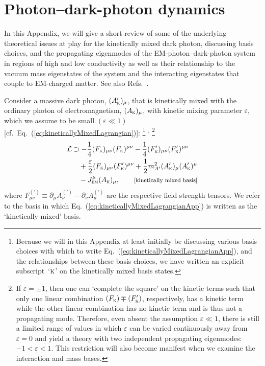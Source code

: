 \documentclass[amsmath,amssymb,aps,10pt,prd,letterpaper,nofootinbib,balancelastpage,notitlepage,superscriptaddress,twocolumn,floatfix]{revtex4-2}
\newcommand{\up}[1]{\textsuperscript{#1}}			%
\renewcommand{\eqref}[2][]{Eq{#1}.~(\ref{eq:#2})}	%
\newcommand{\citeR}[2][]{Ref{#1}.~\cite{#2}}		%
\newcommand{\nl}{\nonumber \\ & \quad }					%
\newcommand{\LL}{\mathcal{L}}
\newcommand{\kin}[1]{({#1}_{\textsc{k}})}
\newcommand{\primekin}[1]{({#1}_{\textsc{k}}^\prime)}
\begin{document}
\section{Photon--dark-photon dynamics}
\label{app:systemBehavior}

In this Appendix, we will give a short review of some of the underlying theoretical issues at play for the kinetically mixed dark photon, discussing basis choices, and the propagating eigenmodes of the EM-photon--dark-photon system in regions of high and low conductivity as well as their relationship to the vacuum mass eigenstates of the system and the interacting eigenstates that couple to EM-charged matter.
See also \citeR[s]{Nelson:2011sf,Graham:2014sha,Chaudhuri:2014dla,Raffelt:1996wa}.

Consider a massive dark photon, $(A_{\textsc{k}}')_\mu$, that is kinetically mixed with the ordinary photon of electromagnetism, $(A_{\textsc{k}})_\mu$, with kinetic mixing parameter $\varepsilon$, which we assume to be small $(\varepsilon \ll 1)$ [cf.~\eqref{kineticallyMixedLagrangian}]:%
\footnote{\label{ftnt:basisLabel}%
    Because we will in this Appendix at least initially be discussing various basis choices with which to write \eqref{kineticallyMixedLagrangianApp}, and the relationships between these basis choices, we have written an explicit subscript~`$\textsc{k}$' on the kinetically mixed basis states.
}%
\up{,}%
\footnote{\label{ftnt:epsilonLimit}%
    If $\varepsilon = \pm 1$, then one can `complete the square' on the kinetic terms such that only one linear combination $\kin{F} \mp \primekin{F}$, respectively, has a kinetic term while the other linear combination has no kinetic term and is thus not a propagating mode.
    Therefore, even absent the assumption $\varepsilon \ll 1$, there is still a limited range of values in which $\varepsilon$ can be varied continuously away from $\varepsilon = 0$ and yield a theory with two independent propagating eigenmodes: $-1<\varepsilon<1$. 
    This restriction will also become manifest when we examine the interaction and mass bases.
} %
\begin{align}
    \LL &\supset - \frac{1}{4} \kin{F}_{\mu\nu}\kin{F}^{\mu\nu} - \frac{1}{4} \primekin{F}_{\mu\nu} \primekin{F}^{\mu\nu} \nl
    + \frac{\varepsilon}{2} \kin{F}_{\mu\nu} \primekin{F}^{\mu\nu} + \frac{1}{2} m_{A'}^2 \primekin{A}_\mu \primekin{A}^{\mu} \nl
    - J_{\textsc{em}}^\mu \kin{A}_\mu, \qquad \text{\footnotesize[kinetically mixed basis]}
    \label{eq:kineticallyMixedLagrangianApp}
\end{align}
where $F^{(\prime)}_{\mu\nu} \equiv \partial_{\mu} A^{(\prime)}_{\nu} - \partial_{\nu} A^{(\prime)}_{\mu}$ are the respective field strength tensors.
We refer to the basis in which \eqref{kineticallyMixedLagrangianApp} is written as the `kinetically mixed' basis.
\end{document}
